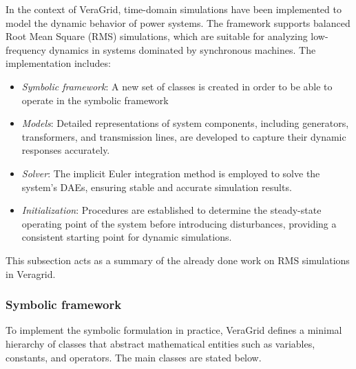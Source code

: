 In the context of VeraGrid, time-domain simulations have been implemented to model the dynamic behavior of power systems.
The framework supports balanced Root Mean Square (RMS) simulations, which are suitable for analyzing low-frequency dynamics in systems dominated by synchronous machines.
The implementation includes:

\begin{itemize}
    \item \textit{Symbolic framework}: A new set of classes is created in order to be able to operate in the symbolic framework
    \item \textit{Models}: Detailed representations of system components, including generators, transformers, and transmission lines, are developed to capture their dynamic
    responses accurately.
    \item \textit{Solver}: The implicit Euler integration method is employed to solve the system's DAEs, ensuring stable and accurate simulation results.
    \item \textit{Initialization}: Procedures are established to determine the steady-state operating point of the system before introducing disturbances,
    providing a consistent starting point for dynamic simulations.
\end{itemize}

This subsection acts as a summary of the already done work on RMS simulations in Veragrid.

\subsubsection{Symbolic framework}
To implement the symbolic formulation in practice, VeraGrid defines a minimal hierarchy  of classes that abstract mathematical entities such as variables,
 constants, and operators. The main classes are stated below.

